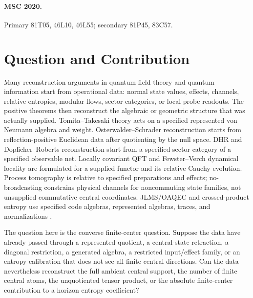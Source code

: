 \documentclass[12pt]{article}
\theoremstyle{definition}
\theoremstyle{remark}
\begin{document}
\paragraph{MSC 2020.}
Primary 81T05, 46L10, 46L55; secondary 81P45, 83C57.

\section{Question and Contribution}

Many reconstruction arguments in quantum field theory and quantum information
start from operational data: normal state values, effects, channels, relative
entropies, modular flows, sector categories, or local probe readouts.  The
positive theorems then reconstruct the algebraic or geometric structure that
was actually supplied.  Tomita--Takesaki theory acts on a specified represented
von Neumann algebra and weight.  Osterwalder--Schrader reconstruction starts
from reflection-positive Euclidean data after quotienting by the null space.
DHR and Doplicher--Roberts reconstruction start from a specified sector
category of a specified observable net.  Locally covariant QFT and
Fewster--Verch dynamical locality are formulated for a supplied functor and its
relative Cauchy evolution.  Process tomography is relative to specified
preparations and effects; no-broadcasting constrains physical channels for
noncommuting state families, not unsupplied commutative central coordinates.
JLMS/OAQEC and crossed-product entropy use specified code algebras, represented
algebras, traces, and normalizations
\cite{TakesakiI,TakesakiII,OS1,OS2,DHR1,DHR2,DRDuality,DR,BFV,FewsterVerch,
FewsterVerchMeasurements,Choi,Jamiolkowski,NoBroadcasting,Petz,JLMS,HarlowRT,DHW,
WittenCrossed,LongoWitten,CLPW,CPW}.

The question here is the converse finite-center question.  Suppose the data
have already passed through a represented quotient, a central-state retraction,
a diagonal restriction, a generated algebra, a restricted input/effect family,
or an entropy calibration that does not see all finite central directions.  Can
the data nevertheless reconstruct the full ambient central support, the number
of finite central atoms, the unquotiented tensor product, or the absolute
finite-center contribution to a horizon entropy coefficient?
\end{document}
